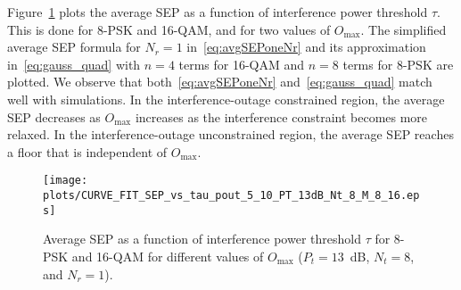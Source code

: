\documentclass[12pt,draftcls,peerreview,onecolumn]{IEEEtran}
\newcommand{\lam}{\lambda}
\newcommand{\Nt}{{N_t}}
\newcommand{\Nr}{{N_r}}
\newcommand{\Pt}{{P_t}}
\newcommand{\outmax}{O_{\text{max}}}
\newcommand{\itau}{\tau}
\newcommand{\cone}{c_{1}}
\begin{document}
Figure~\ref{fig:SEP_vs_tau_QAM} plots the average SEP as a function of interference power threshold $\tau$. This is done for 8-PSK and 16-QAM, and for two values of $\outmax$. The simplified average SEP formula for $\Nr=1$ in~\eqref{eq:avgSEPoneNr} and its approximation in~\eqref{eq:gauss_quad} with $n = 4$ terms for 16-QAM and $n=8$ terms for 8-PSK  are plotted. We observe that both~\eqref{eq:avgSEPoneNr} and~\eqref{eq:gauss_quad} match well with simulations. In the interference-outage constrained region, the average SEP decreases as $\outmax$ increases as the interference constraint becomes more relaxed. In the interference-outage unconstrained region, the average SEP reaches a floor that is  independent of $\outmax$.  %

\begin{figure}
	\centering \texttt{[image: plots/CURVE\_FIT\_SEP\_vs\_tau\_pout\_5\_10\_PT\_13dB\_Nt\_8\_M\_8\_16.eps]}
	\caption{Average SEP as a function of interference power threshold $\itau$ for 8-PSK and 16-QAM for different values of $\outmax$ ($\Pt = 13$~dB, $\Nt=8$, and $\Nr=1$).}
	\label{fig:SEP_vs_tau_QAM}
\end{figure}




\end{document}
